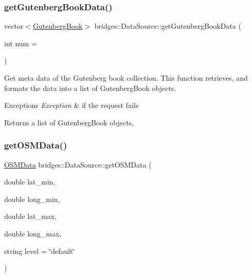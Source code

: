 \subsubsection{\texorpdfstring{get\+Gutenberg\+Book\+Data()}{getGutenbergBookData()}}
{\footnotesize\ttfamily vector$<$\hyperlink{classbridges_1_1dataset_1_1_gutenberg_book}{Gutenberg\+Book}$>$ bridges\+::\+Data\+Source\+::get\+Gutenberg\+Book\+Data (\begin{DoxyParamCaption}\item[{int}]{num = {} }\end{DoxyParamCaption})\hspace{0.3cm}{\ttfamily [inline]}}



Get meta data of the Gutenberg book collection. This function retrieves, and formats the data into a list of Gutenberg\+Book objects. 


\begin{DoxyExceptions}{Exceptions}
{\em Exception} & if the request fails\\
\hline
\end{DoxyExceptions}
\begin{DoxyReturn}{Returns}
a list of Gutenberg\+Book objects, 
\end{DoxyReturn}
\mbox{\label{classbridges_1_1_data_source_a57736934a90bdb86948a7c338ec81a2d}} 
\subsubsection{\texorpdfstring{get\+O\+S\+M\+Data()}{getOSMData()}\hspace{0.1cm}{\footnotesize\ttfamily [1/2]}}
{\footnotesize\ttfamily \hyperlink{classbridges_1_1dataset_1_1_o_s_m_data}{O\+S\+M\+Data} bridges\+::\+Data\+Source\+::get\+O\+S\+M\+Data (\begin{DoxyParamCaption}\item[{double}]{lat\+\_\+min,  }\item[{double}]{long\+\_\+min,  }\item[{double}]{lat\+\_\+max,  }\item[{double}]{long\+\_\+max,  }\item[{string}]{level = {\ttfamily \char`\"{}default\char`\"{}} }\end{DoxyParamCaption})\hspace{0.3cm}{\ttfamily [inline]}}



